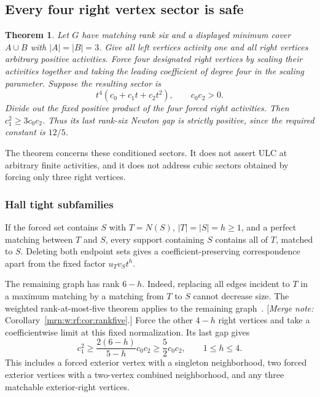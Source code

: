\documentclass[11pt,a4paper]{article}
\newtheorem{theorem}{Theorem}[section]
\theoremstyle{remark}\newtheorem{remark}[theorem]{Remark}
\newcommand{\mnote}[1]{[\textit{Merge note:} #1]}
\begin{document}
\subsection{Every four right vertex sector is safe}
\begin{theorem}\label{mrn:s:ne:thm:conditional}
Let $G$ have matching rank six and a displayed minimum cover $A\cup B$ with $|A|=|B|=3$. Give all left vertices activity one and all right vertices arbitrary positive activities. Force four designated right vertices by scaling their activities together and taking the leading coefficient of degree four in the scaling parameter. Suppose the resulting sector is
\[
 t^4(c_0+c_1t+c_2t^2),\qquad c_0c_2>0.
\]
Divide out the fixed positive product of the four forced right activities. Then $c_1^2\ge3c_0c_2$. Thus its last rank-six Newton gap is strictly positive, since the required constant is $12/5$.
\end{theorem}
The theorem concerns these conditioned sectors. It does not assert ULC at arbitrary finite activities, and it does not address cubic sectors obtained by forcing only three right vertices.

\subsubsection{Hall tight subfamilies}
If the forced set contains $S$ with $T=N(S)$, $|T|=|S|=h\ge1$, and a perfect matching between $T$ and $S$, every support containing $S$ contains all of $T$, matched to $S$. Deleting both endpoint sets gives a coefficient-preserving correspondence apart from the fixed factor $u_Tv_St^h$.

The remaining graph has rank $6-h$. Indeed, replacing all edges incident to $T$ in a maximum matching by a matching from $T$ to $S$ cannot decrease size. The weighted rank-at-most-five theorem applies to the remaining graph~\cite{b:m74}. \mnote{Corollary~\ref{mrn:w:rf:cor:rankfive}.} Force the other $4-h$ right vertices and take a coefficientwise limit at this fixed normalization. Its last gap gives
\begin{equation}\label{mrn:s:ne:eq:tightbound}
 c_1^2\ge\frac{2(6-h)}{5-h}c_0c_2\ge\frac52c_0c_2,
 \qquad 1\le h\le4.
\end{equation}
This includes a forced exterior vertex with a singleton neighborhood, two forced exterior vertices with a two-vertex combined neighborhood, and any three matchable exterior-right vertices.
\end{document}
